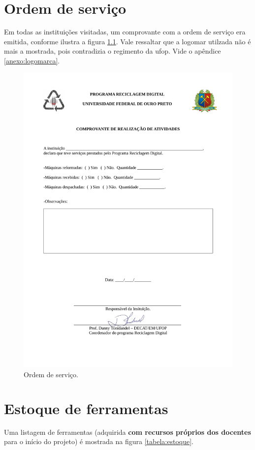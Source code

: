 \documentclass[
	12pt,				%
	openright,			%
	oneside,			%
	a4paper,			%
	english,			%
	spanish,			%
	brazil,				%
	]{abntex2}
\begin{document}
\begin{apendicesenv}
\chapter{Ordem de serviço}
Em todas as instituições visitadas, um comprovante com a ordem de serviço era emitida, conforme ilustra a figura \ref{ordem-servico}. Vale ressaltar que a logomar utilzada não é mais a mostrada, pois contradizia o regimento da ufop. Vide o apêndice \ref{anexo:logomarca}.
\begin{figure}
	\centering
	\includegraphics[scale=0.7]{figuras/comprovante-servico.pdf} 
	\caption{Ordem de serviço.}
	\label{ordem-servico}
\end{figure} 

\chapter{Estoque de ferramentas}
Uma listagem de ferramentas (adquirida \textbf{com recursos próprios dos docentes} para o início do projeto) é mostrada na figura \ref{tabela:estoque}.


\end{apendicesenv}
\end{document}

